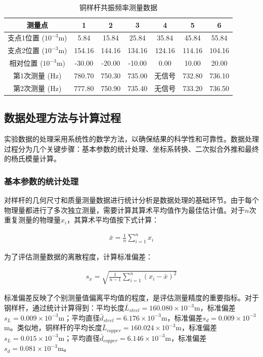 ﻿\documentclass[12pt,a4paper]{article}
\begin{document}
\begin{table}[H]
\centering
\caption{铜样杆共振频率测量数据}
\begin{tabular}{|c|c|c|c|c|c|c|}
\hline
测量点 & 1 & 2 & 3 & 4 & 5 & 6 \\
\hline
支点1位置 ($10^{-3}$m) & 5.84 & 15.84 & 25.84 & 35.84 & 45.84 & 55.84 \\
\hline
支点2位置 ($10^{-3}$m) & 154.16 & 144.16 & 134.16 & 124.16 & 114.16 & 104.16 \\
\hline
相对位置 ($10^{-3}$m) & -30.00 & -20.00 & -10.00 & 0.00 & 10.00 & 20.00 \\
\hline
第1次测量 (Hz) & 780.70 & 750.30 & 735.00 & 无信号 & 732.80 & 736.10 \\
\hline
第2次测量 (Hz) & 777.80 & 750.90 & 735.40 & 无信号 & 733.20 & 736.50 \\
\hline
\end{tabular}
\end{table}

\subsection{数据处理方法与计算过程}

实验数据的处理采用系统性的数学方法，以确保结果的科学性和可靠性。数据处理过程分为几个关键步骤：基本参数的统计处理、坐标系转换、二次拟合外推和最终的杨氏模量计算。

\subsubsection{基本参数的统计处理}

对样杆的几何尺寸和质量测量数据进行统计分析是数据处理的基础环节。由于每个物理量都进行了多次独立测量，需要计算其算术平均值作为最佳估计值。对于$n$次重复测量的物理量$x_i$，其算术平均值按下式计算：

\begin{align}
\bar{x} = \frac{1}{n}\sum_{i=1}^{n} x_i \tag{7}
\end{align}

为了评估测量数据的离散程度，计算标准偏差：

\begin{align}
s_x = \sqrt{\frac{1}{n-1}\sum_{i=1}^{n}(x_i-\bar{x})^2} \tag{8}
\end{align}

标准偏差反映了个别测量值偏离平均值的程度，是评估测量精度的重要指标。对于钢样杆，通过统计计算得到：平均长度$\bar{L}_{steel} = 160.080 \times 10^{-3}$m，标准偏差$s_L = 0.009 \times 10^{-3}$m；平均直径$\bar{d}_{steel} = 6.176 \times 10^{-3}$m，标准偏差$s_d = 0.009 \times 10^{-3}$m。类似地，铜样杆的平均长度$\bar{L}_{copper} = 160.024 \times 10^{-3}$m，标准偏差$s_L = 0.015 \times 10^{-3}$m；平均直径$\bar{d}_{copper} = 6.146 \times 10^{-3}$m，标准偏差$s_d = 0.081 \times 10^{-3}$m。
\end{document}
